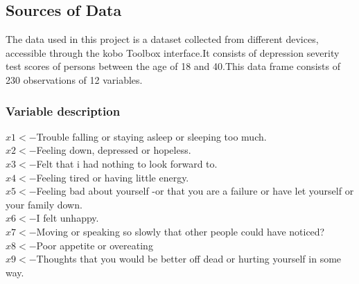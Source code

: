 \documentclass[12pt]{article}
\begin{document}
\subsection{Sources of Data}
The data used in this project is a dataset collected from different devices, accessible through the kobo Toolbox interface.It consists of depression severity test scores of persons between the age of 18 and 40.This data frame consists of 230 observations of 12 variables.
\subsubsection{Variable description}
$x1<-$Trouble falling or staying asleep or sleeping too much.\\
$x2<-$Feeling down, depressed or hopeless.\\
$x3<-$Felt that i had nothing to look forward to.\\
$x4<-$Feeling tired or having little energy.\\
$x5<-$Feeling bad about yourself -or that you are a failure or have let yourself or your family down.\\
$x6<-$I felt unhappy.\\
$x7<-$Moving or speaking so slowly that other people could have noticed?\\
$x8<-$Poor appetite or overeating\\
$x9<-$Thoughts that you would be better off dead or hurting yourself in some way.
\end{document}
